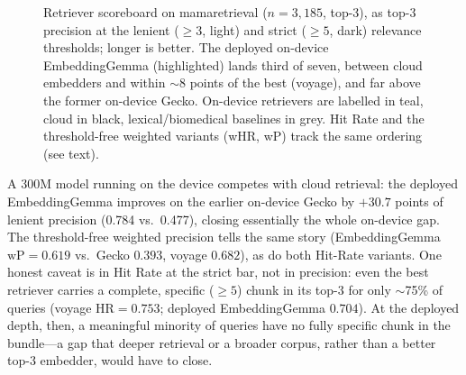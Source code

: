 \begin{figure}[t]
\centering
{}
\caption{Retriever scoreboard on mamaretrieval ($n=3{,}185$, top-3), as top-3
precision at the lenient ($\ge3$, light) and strict ($\ge5$, dark) relevance
thresholds; longer is better. The deployed on-device EmbeddingGemma
(highlighted) lands third of seven, between cloud embedders and within
$\sim$8 points of the best (voyage), and far above the former on-device
Gecko. On-device retrievers are labelled in teal, cloud in black,
lexical/biomedical baselines in grey. Hit Rate and the threshold-free
weighted variants (wHR, wP) track the same ordering (see text).}
\label{fig:retrievers}
\end{figure}

A 300M model running on the device competes with cloud retrieval: the deployed
EmbeddingGemma improves on the earlier on-device Gecko by $+30.7$ points of
lenient precision (0.784 vs.\ 0.477), closing essentially the whole on-device
gap. The threshold-free weighted precision tells the same story (EmbeddingGemma
$\text{wP}=0.619$ vs.\ Gecko $0.393$, voyage $0.682$), as do both Hit-Rate
variants. One honest caveat is in Hit Rate at the strict bar, not in
precision: even the best retriever carries a complete, specific ($\ge5$)
chunk in its top-3 for only $\sim$75\% of queries (voyage $\text{HR}=0.753$;
deployed EmbeddingGemma $0.704$). At the deployed depth, then, a meaningful
minority of queries have no fully specific chunk in the bundle---a gap that
deeper retrieval or a broader corpus, rather than a better top-3 embedder,
would have to close.

